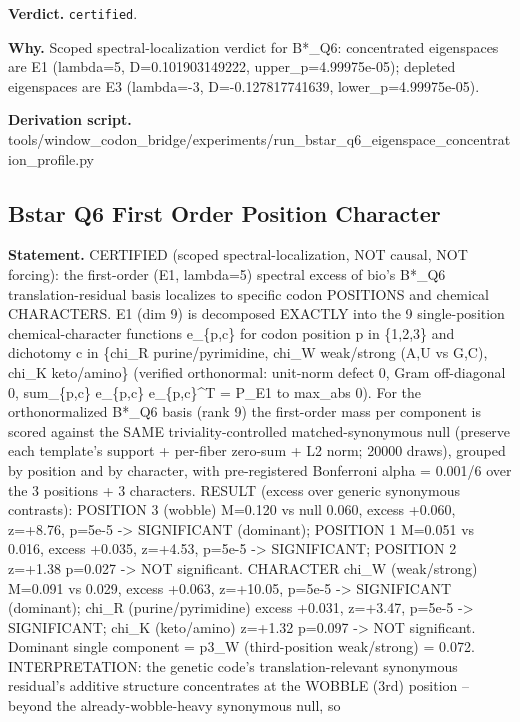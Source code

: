 \textbf{Verdict.} \texttt{certified}.

\textbf{Why.} Scoped spectral-localization verdict for B*\_Q6: concentrated eigenspaces are E1 (lambda=5,
D=0.101903149222, upper\_p=4.99975e-05); depleted eigenspaces are E3 (lambda=-3, D=-0.127817741639,
lower\_p=4.99975e-05).

\textbf{Derivation script.} tools/window\_codon\_bridge/experiments/run\_bstar\_q6\_eigenspace\_concentration\_profile.py

\subsection{Bstar Q6 First Order Position Character}\label{sec:bridge-bstar-q6-first-order-position-character}
\textbf{Statement.} CERTIFIED (scoped spectral-localization, NOT causal, NOT forcing): the first-order (E1, lambda=5)
spectral excess of bio's B*\_Q6 translation-residual basis localizes to specific codon POSITIONS and
chemical CHARACTERS. E1 (dim 9) is decomposed EXACTLY into the 9 single-position chemical-character
functions e\_\{p,c\} for codon position p in \{1,2,3\} and dichotomy c in \{chi\_R
purine/pyrimidine, chi\_W weak/strong (A,U vs G,C), chi\_K keto/amino\} (verified orthonormal:
unit-norm defect 0, Gram off-diagonal 0, sum\_\{p,c\} e\_\{p,c\} e\_\{p,c\}\textasciicircum{}T =
P\_E1 to max\_abs 0). For the orthonormalized B*\_Q6 basis (rank 9) the first-order mass per
component is scored against the SAME triviality-controlled matched-synonymous null (preserve each
template's support + per-fiber zero-sum + L2 norm; 20000 draws), grouped by position and by
character, with pre-registered Bonferroni alpha = 0.001/6 over the 3 positions + 3 characters.
RESULT (excess over generic synonymous contrasts): POSITION 3 (wobble) M=0.120 vs null 0.060, excess
+0.060, z=+8.76, p=5e-5 -> SIGNIFICANT (dominant); POSITION 1 M=0.051 vs 0.016, excess +0.035,
z=+4.53, p=5e-5 -> SIGNIFICANT; POSITION 2 z=+1.38 p=0.027 -> NOT significant. CHARACTER chi\_W
(weak/strong) M=0.091 vs 0.029, excess +0.063, z=+10.05, p=5e-5 -> SIGNIFICANT (dominant); chi\_R
(purine/pyrimidine) excess +0.031, z=+3.47, p=5e-5 -> SIGNIFICANT; chi\_K (keto/amino) z=+1.32
p=0.097 -> NOT significant. Dominant single component = p3\_W (third-position weak/strong) = 0.072.
INTERPRETATION: the genetic code's translation-relevant synonymous residual's additive structure
concentrates at the WOBBLE (3rd) position -- beyond the already-wobble-heavy synonymous null, so
